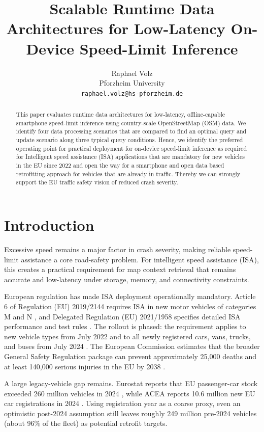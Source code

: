 \documentclass{article}
\title{Scalable Runtime Data Architectures for Low-Latency On-Device Speed-Limit Inference}
\author{
  Raphael Volz \\
  Pforzheim University \\
  \texttt{raphael.volz@hs-pforzheim.de}
}
\begin{document}
\maketitle

\begin{abstract}
This paper evaluates runtime data architectures for low-latency, offline-capable smartphone speed-limit inference using country-scale OpenStreetMap (OSM) data. We identify four data processing scenarios that are compared to find an optimal query and update scenario along three typical query conditions. Hence, we identify the preferred operating point for practical deployment for on-device speed-limit inference as required for Intelligent speed assistance (ISA) applications that are mandatory for new vehicles in the EU since 2022 and open the way for a smartphone and open data based retrofitting approach for vehicles that are already in traffic. Thereby we can strongly support the EU traffic safety vision of reduced crash severity.
\end{abstract}


\section{Introduction}
Excessive speed remains a major factor in crash severity, making reliable speed-limit assistance a core road-safety problem. For intelligent speed assistance (ISA), this creates a practical requirement for map context retrieval that remains accurate and low-latency under storage, memory, and connectivity constraints.

European regulation has made ISA deployment operationally mandatory. Article 6 of Regulation (EU) 2019/2144 requires ISA in new motor vehicles of categories M and N \cite{eu2019_2144}, and Delegated Regulation (EU) 2021/1958 specifies detailed ISA performance and test rules \cite{eu2021_1958}. The rollout is phased: the requirement applies to new vehicle types from July 2022 and to all newly registered cars, vans, trucks, and buses from July 2024 \cite{eu_mandatory_safety_2024}. The European Commission estimates that the broader General Safety Regulation package can prevent approximately 25{,}000 deaths and at least 140{,}000 serious injuries in the EU by 2038 \cite{eu_mandatory_safety_2024}.

A large legacy-vehicle gap remains. Eurostat reports that EU passenger-car stock exceeded 260 million vehicles in 2024 \cite{eurostat_passenger_cars_2026}, while ACEA reports 10.6 million new EU car registrations in 2024 \cite{acea_registrations_2024}. Using registration year as a coarse proxy, even an optimistic post-2024 assumption still leaves roughly 249 million pre-2024 vehicles (about 96\% of the fleet) as potential retrofit targets.
\end{document}
